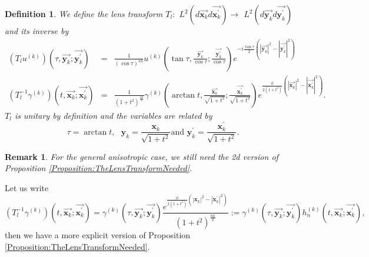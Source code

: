 \documentclass[reqno]{amsart}
\theoremstyle{plain}
\newtheorem{definition}{Definition}
\newtheorem{remark}{Remark}
\numberwithin{equation}{section}
\begin{document}
\begin{definition}
We define the lens transform $T_{l}:$ $L^{2}(d\overrightarrow{\mathbf{x}_{k}}d\overrightarrow{\mathbf{x}_{k}^{\prime }})\rightarrow $ $L^{2}(d\overrightarrow{\mathbf{y}_{k}}d\overrightarrow{\mathbf{y}_{k}^{\prime }})$
and its inverse by\begin{eqnarray*}
\left( T_{l}u^{(k)}\right) (\tau ,\overrightarrow{\mathbf{y}_{k}};\overrightarrow{\mathbf{y}_{k}^{\prime }}) &=&\frac{1}{(\cos \tau )^{nk}}u^{(k)}(\tan \tau ,\frac{\overrightarrow{\mathbf{y}_{k}}}{\cos \tau };\frac{\overrightarrow{\mathbf{y}_{k}^{\prime }}}{\cos \tau })e^{-i\frac{\tan \tau 
}{2}(\left\vert \overrightarrow{\mathbf{y}_{k}}\right\vert ^{2}-\left\vert 
\overrightarrow{\mathbf{y}_{k}^{\prime }}\right\vert ^{2})} \\
\left( T_{l}^{-1}\gamma ^{(k)}\right) (t,\overrightarrow{\mathbf{x}_{k}};\overrightarrow{\mathbf{x}_{k}^{\prime }}) &=&\frac{1}{\left( 1+t^{2}\right)
^{\frac{nk}{2}}}\gamma ^{(k)}(\arctan t,\frac{\overrightarrow{\mathbf{x}_{k}}}{\sqrt{1+t^{2}}};\frac{\overrightarrow{\mathbf{x}_{k}^{\prime }}}{\sqrt{1+t^{2}}})e^{\frac{it}{2(1+t^{2})}\left( \left\vert \overrightarrow{\mathbf{x}_{k}}\right\vert ^{2}-\left\vert \overrightarrow{\mathbf{x}_{k}^{\prime }}\right\vert ^{2}\right) }.
\end{eqnarray*}$T_{l}$ is unitary by definition and the variables are related by\begin{equation*}
\tau =\arctan t,\text{ }\mathbf{y}_{k}=\frac{\mathbf{x}_{k}}{\sqrt{1+t^{2}}}\text{and }\mathbf{y}_{k}^{\prime }=\frac{\mathbf{x}_{k}^{\prime }}{\sqrt{1+t^{2}}}.
\end{equation*}
\end{definition}

\begin{remark}
For the general anisotropic case, we still need the 2d version of
Proposition \ref{Proposition:TheLensTransformNeeded}.
\end{remark}

Let us write\begin{equation*}
\left( T_{l}^{-1}\gamma ^{(k)}\right) (t,\overrightarrow{\mathbf{x}_{k}};\overrightarrow{\mathbf{x}_{k}^{\prime }})=\gamma ^{(k)}(\tau ,\overrightarrow{\mathbf{y}_{k}};\overrightarrow{\mathbf{y}_{k}^{\prime }})\frac{e^{\frac{it}{2(1+t^{2})}\left( \left\vert \mathbf{x}_{k}\right\vert
^{2}-\left\vert \mathbf{x}_{k}^{\prime }\right\vert ^{2}\right) }}{\left(
1+t^{2}\right) ^{\frac{nk}{2}}}:=\gamma ^{(k)}(\tau ,\overrightarrow{\mathbf{y}_{k}};\overrightarrow{\mathbf{y}_{k}^{\prime }})h_{n}^{(k)}(t,\overrightarrow{\mathbf{x}_{k}};\overrightarrow{\mathbf{x}_{k}^{\prime }}),
\end{equation*}then we have a more explicit version of Proposition \ref{Proposition:TheLensTransformNeeded}.
\end{document}
